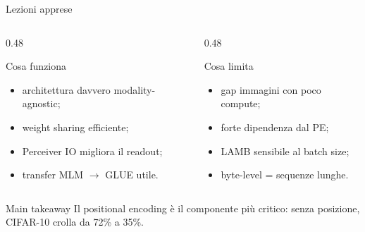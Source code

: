 \documentclass[aspectratio=169,10pt]{beamer}
\begin{document}
\begin{frame}{Lezioni apprese}
\small
\begin{columns}[T]
\begin{column}{0.48\textwidth}
\begin{exampleblock}{Cosa funziona}
\begin{itemize}
  \item architettura davvero modality-agnostic;
  \item weight sharing efficiente;
  \item Perceiver IO migliora il readout;
  \item transfer MLM $\rightarrow$ GLUE utile.
\end{itemize}
\end{exampleblock}
\end{column}
\begin{column}{0.48\textwidth}
\begin{alertblock}{Cosa limita}
\begin{itemize}
  \item gap immagini con poco compute;
  \item forte dipendenza dal PE;
  \item LAMB sensibile al batch size;
  \item byte-level = sequenze lunghe.
\end{itemize}
\end{alertblock}
\end{column}
\end{columns}

\begin{block}{Main takeaway}
Il positional encoding è il componente più critico: senza posizione, CIFAR-10 crolla da 72\% a 35\%.
\end{block}
\end{frame}
\end{document}
